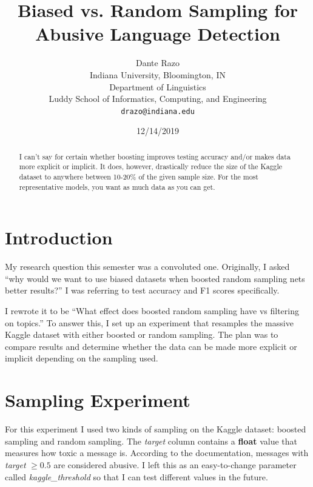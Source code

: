 \documentclass[11pt,a4paper]{article}
\title{Biased vs. Random Sampling for Abusive Language Detection}
\author{Dante Razo \\
	Indiana University, Bloomington, IN \\
	Department of Linguistics \\
	Luddy School of Informatics, Computing, and Engineering \\
	{\tt drazo@indiana.edu} \\}
\date{12/14/2019}
\begin{document}
\maketitle


\begin{abstract}
I can't say for certain whether boosting improves testing accuracy and/or makes data more explicit or implicit. It does, however, drastically reduce the size of the Kaggle dataset to anywhere between 10-20\% of the given sample size. For the most representative models, you want as much data as you can get.
\end{abstract}

\section{Introduction} %
My research question this semester was a convoluted one. Originally, I asked ``why would we want to use biased datasets when boosted random sampling nets better results?'' I was referring to test accuracy and F1 scores specifically.

I rewrote it to be ``What effect does boosted random sampling have vs filtering on topics.'' To answer this, I set up an experiment that resamples the massive Kaggle dataset with either boosted or random sampling. The plan was to compare results and determine whether the data can be made more explicit or implicit depending on the sampling used.

\section{Sampling Experiment}
For this experiment I used two kinds of sampling on the Kaggle dataset: boosted sampling and random sampling. The \textit{target} column contains a \textbf{float} value that measures how toxic a message is. According to the documentation, messages with \textit{target} $\geq 0.5$ are considered abusive. I left this as an easy-to-change parameter called \textit{kaggle\_threshold} so that I can test different values in the future.
\end{document}
